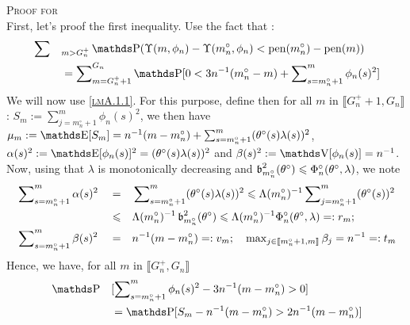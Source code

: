 \begin{pro}{\textsc{Proof for } \\}\label{proB.1.2}
First, let's proof the first inequality.
Use the fact that : 
\begin{alignat*}{2}
& \sum\nolimits && _{m > G^{+}_{n}} \P(\Upsilon(m, \phi_{n}) - \Upsilon(m^{\circ}_{n}, \phi_{n}) < \pen(m^{\circ}_{n}) - \pen(m))\\
& && = \sum\nolimits_{m = G_{n}^{+} + 1}^{G_{n}} \P[0 < 3 n^{-1} (m_{n}^{\circ} - m ) + \sum\nolimits_{s = m_{n}^{\circ} + 1}^{m} \phi_{n}(s)^{2}]
\end{alignat*}
We will now use \textsc{\cref{lmA.1.1}}. For this purpose, define then for all $m$ in $\llbracket G_{n}^{+} + 1, G_{n} \rrbracket$ : $S_{m} := \sum\nolimits_{j = m_{n}^{\circ} + 1}^{m} \phi_{n}(s)^{2}$, we then have $\mu_{m} := \E[S_{m}] = n^{-1} (m- m_{n}^{\circ}) + \sum\nolimits_{s = m_{n}^{\circ} + 1}^{m} (\theta^{\circ}(s)\lambda(s))^{2}$, $\alpha(s)^{2} := \E[\phi_{n}(s)]^{2} = (\theta^{\circ}(s)\lambda(s))^{2}$ and $\beta(s)^{2} := \V[\phi_{n}(s)] = n^{-1}$.
Now, using that $\lambda$ is monotonically decreasing and $\operatorname{\mathfrak{b}}_{m_{n}^{\circ}}^{2}(\theta^{\circ}) \leqslant \Phi_{n}^{\circ}(\theta^{\circ}, \lambda)$, we note
\begin{alignat*}{3}
&\sum\nolimits_{s = m_{n}^{\circ} + 1}^{m} \alpha(s)^{2} &&=&& \sum\nolimits_{s = m_{n}^{\circ} + 1}^{m}(\theta^{\circ}(s)\lambda(s))^{2} \leqslant \Lambda(m_{n}^{\circ})^{-1} \sum\nolimits_{j = m_{n}^{\circ} + 1}^{m}(\theta^{\circ}(s))^{2} \\
& &&\leqslant&& \Lambda(m_{n}^{\circ})^{-1} \operatorname{\mathfrak{b}}_{m_{n}^{\circ}}^{2}(\theta^{\circ}) \leqslant \Lambda(m_{n}^{\circ})^{-1} \Phi_{n}^{\circ}(\theta^{\circ}, \lambda) =: r_{m};\\
&\sum\nolimits_{s = m_{n}^{\circ} + 1}^{m} \beta(s)^{2} &&=&& n^{-1}(m - m_{n}^{\circ}) =: v_{m}; \quad \max\nolimits_{j \in \llbracket m_{n}^{\circ} + 1, m \rrbracket} \beta_{j} = n^{-1} =: t_{m}
\end{alignat*}
Hence, we have, for all $m$ in $\llbracket G_{n}^{+}, G_{n}\rrbracket$
\begin{alignat*}{2}
&\P && [\sum\nolimits_{s = m_{n}^{\circ} + 1}^{m} \phi_{n}(s)^{2} - 3 n^{-1}(m - m_{n}^{\circ}) > 0] \\
& && =\P[S_{m} - n^{-1} (m - m_{n}^{\circ}) > 2 n^{-1} (m - m_{n}^{\circ})]\\

\end{alignat*}
\end{pro}
